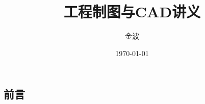 \documentclass[12pt,twoside]{book}
\begin{document}
\begin{CJK}{UTF8}{song}

\title{\Huge 工程制图与CAD讲义}
\author{\Large 金波}
\date{\today}
\maketitle
\CJKtilde
\frontmatter
\chapter*{前言}
\tableofcontents
\mainmatter
\graphicspath{{cad/pdf/}{cad/png/}}







\backmatter
\printindex

\newpage
\end{CJK}
\end{document}
